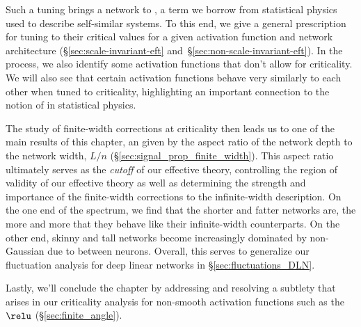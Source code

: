 Such a tuning brings a network to , a term we borrow from statistical physics used to describe self-similar systems.
To this end, we give a general prescription for tuning  to their critical values for a given activation function and network architecture (\S\ref{sec:scale-invariant-eft} and~\S\ref{sec:non-scale-invariant-eft}). In the process, we also identify some activation functions that don't allow for criticality.
We will also see that certain activation functions behave very similarly to each other when tuned to criticality, highlighting an important connection to the notion of  in statistical physics.

The study of finite-width corrections at criticality then leads us to one of the main results of this chapter, an  given by the aspect ratio of the network depth to the network width, $L/n$ (\S\ref{sec:signal_prop_finite_width}).
This aspect ratio ultimately
serves as the 
\emph{cutoff} of our effective theory, %
controlling the region of validity of our effective theory as well as determining the strength and importance of the finite-width corrections to the infinite-width description.
On the one end of the spectrum, we find that the shorter and fatter networks are, the more and more that they behave like their infinite-width counterparts. 
On the other end, skinny and tall networks become increasingly dominated by non-Gaussian  due to  between neurons. Overall, this serves to generalize our fluctuation analysis for deep linear networks in \S\ref{sec:fluctuations_DLN}.


Lastly, we'll  conclude the chapter by addressing and resolving a subtlety that arises in our criticality analysis for non-smooth activation functions such as the $\relu$ (\S\ref{sec:finite_angle}).








































